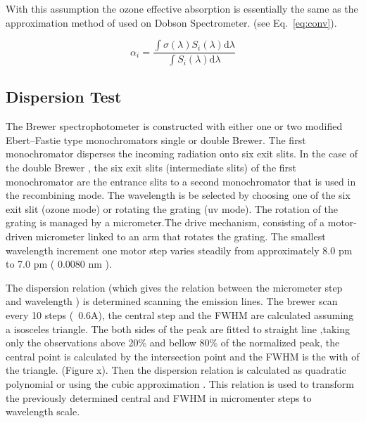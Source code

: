 \documentclass[acp]{copernicus} %
\begin{document}
With this assumption the ozone effective absorption is essentially the same as the approximation method of \citet{Bernhard2005}  used on Dobson Spectrometer. (see Eq.~\ref{eq:conv}).


      \begin{equation}
      \label{eq:conv}
            \alpha_i = \frac{\int \sigma(\lambda) S_i(\lambda) \mbox{d}\lambda}{\int S_i(\lambda) \mbox{d}\lambda}
      \end{equation}


\subsection{Dispersion Test}

The Brewer spectrophotometer is constructed with either one or two modified Ebert–Fastie type monochromators single or double Brewer. The first monochromator disperses the incoming radiation onto six exit slits. In the case of the double Brewer , the six exit slits  (intermediate slits) of the first monochromator are the entrance slits to a second monochromator that is used in the recombining mode. The wavelength is be selected by choosing one of the six exit slit (ozone mode) or rotating the grating (uv mode). The rotation of the grating is managed by a micrometer.The drive mechanism, consisting of a motor-driven micrometer linked to an arm that rotates the grating. The smallest wavelength increment one motor step varies steadily from approximately 8.0 pm to 7.0 pm ( 0.0080 \unit{nm} ). 

The dispersion relation (which gives the  relation between the micrometer step and wavelength ) is determined scanning the emission lines. The brewer scan every 10 steps (~0.6A), the central step and the FWHM are calculated assuming a isosceles triangle. The both sides of the peak are  fitted to straight line  ,taking only the observations above 20\%  and bellow 80\% of the normalized peak, the central point is calculated by the intersection point and the FWHM is the with of the triangle. (Figure x). Then the dispersion relation is calculated as quadratic polynomial or using the cubic approximation \citep{Grobner1998}. This relation is used to transform the previously determined central and FWHM in micromenter steps to wavelength scale.
\end{document}
